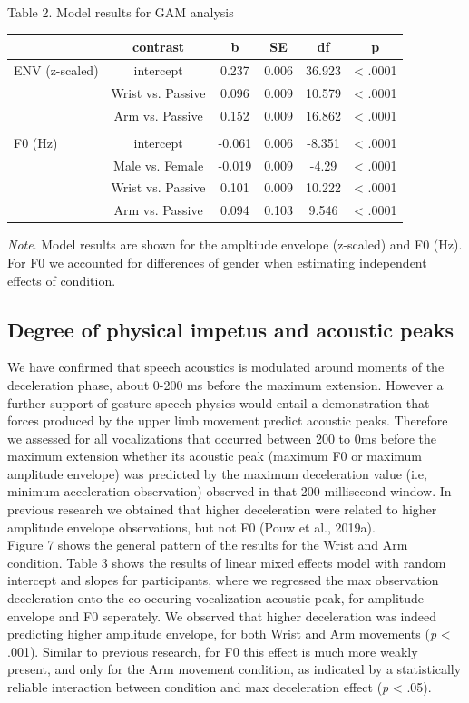 \documentclass[
  man, noextraspace,floatsintext]{apa6}
\begin{document}
Table 2. Model results for GAM analysis

\begin{tabular}{lccccc}
\toprule
  & contrast & b & SE & df & p\\
\midrule
ENV (z-scaled) & intercept & 0.237 & 0.006 & 36.923 & < .0001\\
 & Wrist vs. Passive & 0.096 & 0.009 & 10.579 & < .0001\\
 & Arm vs. Passive & 0.152 & 0.009 & 16.862 & < .0001\\
 &  &  &  &  & \\
F0 (Hz) & intercept & -0.061 & 0.006 & -8.351 & < .0001\\
\addlinespace
 & Male vs. Female & -0.019 & 0.009 & -4.29 & < .0001\\
 & Wrist vs. Passive & 0.101 & 0.009 & 10.222 & < .0001\\
 & Arm vs. Passive & 0.094 & 0.103 & 9.546 & < .0001\\
\bottomrule
\end{tabular}

\emph{Note}. Model results are shown for the ampltiude envelope (z-scaled) and F0 (Hz). For F0 we accounted for differences of gender when estimating independent effects of condition.

\hypertarget{degree-of-physical-impetus-and-acoustic-peaks}{%
\subsection{Degree of physical impetus and acoustic peaks}\label{degree-of-physical-impetus-and-acoustic-peaks}}

We have confirmed that speech acoustics is modulated around moments of the deceleration phase, about 0-200 ms before the maximum extension. However a further support of gesture-speech physics would entail a demonstration that forces produced by the upper limb movement predict acoustic peaks. Therefore we assessed for all vocalizations that occurred between 200 to 0ms before the maximum extension whether its acoustic peak (maximum F0 or maximum amplitude envelope) was predicted by the maximum deceleration value (i.e, minimum acceleration observation) observed in that 200 millisecond window. In previous research we obtained that higher deceleration were related to higher amplitude envelope observations, but not F0 (Pouw et al., 2019a).\\
Figure 7 shows the general pattern of the results for the Wrist and Arm condition. Table 3 shows the results of linear mixed effects model with random intercept and slopes for participants, where we regressed the max observation deceleration onto the co-occuring vocalization acoustic peak, for amplitude envelope and F0 seperately. We observed that higher deceleration was indeed predicting higher amplitude envelope, for both Wrist and Arm movements (\emph{p} \textless{} .001). Similar to previous research, for F0 this effect is much more weakly present, and only for the Arm movement condition, as indicated by a statistically reliable interaction between condition and max deceleration effect (\emph{p} \textless{} .05).
\end{document}

